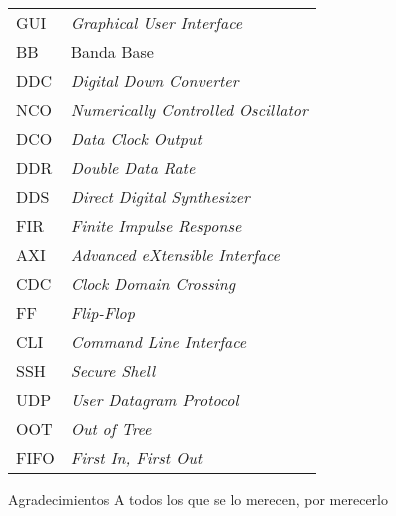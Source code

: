 \documentclass[screen, pagebackref,oneside]{ibtesis}
\begin{document}
\begin{preliminary}
\begin{abreviaturas}
\begin{table}[H]
\begin{tabular}{ll}
            GUI &   \textit{Graphical User Interface}   \\
            BB  &   Banda Base  \\
            DDC &   \textit{Digital Down Converter} \\
            NCO &   \textit{Numerically Controlled Oscillator}  \\
            DCO &   \textit{Data Clock Output}  \\
            DDR &   \textit{Double Data Rate}   \\
            DDS &   \textit{Direct Digital Synthesizer} \\
            FIR &   \textit{Finite Impulse Response}    \\
            AXI &   \textit{Advanced eXtensible Interface}  \\
            CDC &   \textit{Clock Domain Crossing}  \\
            FF  &   \textit{Flip-Flop}  \\
            CLI &   \textit{Command Line Interface} \\  
            SSH &   \textit{Secure Shell}   \\
            UDP &   \textit{User Datagram Protocol} \\
            OOT &   \textit{Out of Tree}    \\
            FIFO &  \textit{First In, First Out}
            \end{tabular}
        \end{table}    
    \end{abreviaturas}
    
    \tableofcontents                %
    \listoffigures                  %
    \listoftables                   %
    
    
\end{preliminary}











\appendix


\begin{biblio}
    
\end{biblio}

\begin{postliminary}

    \begin{seccion}{Agradecimientos}
    A todos los que se lo merecen, por merecerlo
    \end{seccion}
    
\end{postliminary}
    
\end{document}
